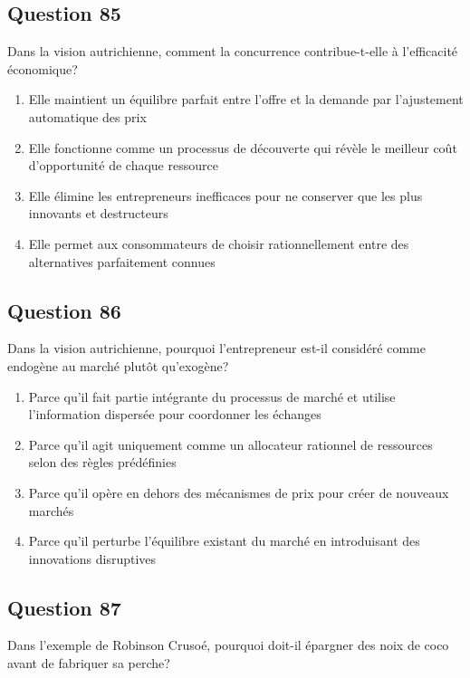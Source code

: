 \documentclass[12pt,a4paper]{article}
\begin{document}
\bigskip


\subsection*{Question 85}
Dans la vision autrichienne, comment la concurrence contribue-t-elle à l'efficacité économique?

\begin{enumerate}[label=\Alph*., leftmargin=*]
\item Elle maintient un équilibre parfait entre l'offre et la demande par l'ajustement automatique des prix
\item Elle fonctionne comme un processus de découverte qui révèle le meilleur coût d'opportunité de chaque ressource
\item Elle élimine les entrepreneurs inefficaces pour ne conserver que les plus innovants et destructeurs
\item Elle permet aux consommateurs de choisir rationnellement entre des alternatives parfaitement connues
\end{enumerate}

\bigskip


\subsection*{Question 86}
Dans la vision autrichienne, pourquoi l'entrepreneur est-il considéré comme endogène au marché plutôt qu'exogène?

\begin{enumerate}[label=\Alph*., leftmargin=*]
\item Parce qu'il fait partie intégrante du processus de marché et utilise l'information dispersée pour coordonner les échanges
\item Parce qu'il agit uniquement comme un allocateur rationnel de ressources selon des règles prédéfinies
\item Parce qu'il opère en dehors des mécanismes de prix pour créer de nouveaux marchés
\item Parce qu'il perturbe l'équilibre existant du marché en introduisant des innovations disruptives
\end{enumerate}

\bigskip


\subsection*{Question 87}
Dans l'exemple de Robinson Crusoé, pourquoi doit-il épargner des noix de coco avant de fabriquer sa perche?
\end{document}
